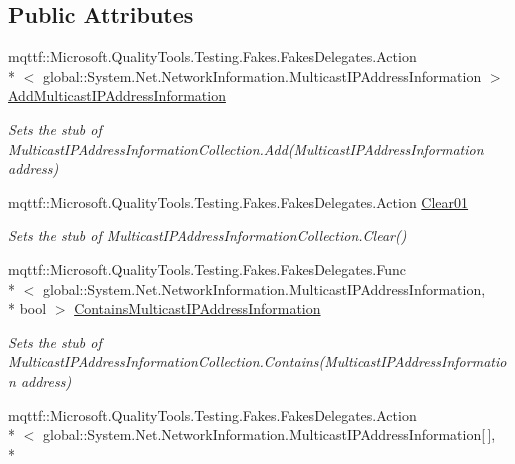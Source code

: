 \subsection*{Public Attributes}
\begin{DoxyCompactItemize}
\item 
mqttf\-::\-Microsoft.\-Quality\-Tools.\-Testing.\-Fakes.\-Fakes\-Delegates.\-Action\\*
$<$ global\-::\-System.\-Net.\-Network\-Information.\-Multicast\-I\-P\-Address\-Information $>$ \hyperlink{class_system_1_1_net_1_1_network_information_1_1_fakes_1_1_stub_multicast_i_p_address_information_collection_a63b557fc15598076c83d2812e9af5eed}{Add\-Multicast\-I\-P\-Address\-Information}
\begin{DoxyCompactList}\small\item\em Sets the stub of Multicast\-I\-P\-Address\-Information\-Collection.\-Add(\-Multicast\-I\-P\-Address\-Information address)\end{DoxyCompactList}\item 
mqttf\-::\-Microsoft.\-Quality\-Tools.\-Testing.\-Fakes.\-Fakes\-Delegates.\-Action \hyperlink{class_system_1_1_net_1_1_network_information_1_1_fakes_1_1_stub_multicast_i_p_address_information_collection_ae9d4bfd16c4dd6411ca37b5b451a81b8}{Clear01}
\begin{DoxyCompactList}\small\item\em Sets the stub of Multicast\-I\-P\-Address\-Information\-Collection.\-Clear()\end{DoxyCompactList}\item 
mqttf\-::\-Microsoft.\-Quality\-Tools.\-Testing.\-Fakes.\-Fakes\-Delegates.\-Func\\*
$<$ global\-::\-System.\-Net.\-Network\-Information.\-Multicast\-I\-P\-Address\-Information, \\*
bool $>$ \hyperlink{class_system_1_1_net_1_1_network_information_1_1_fakes_1_1_stub_multicast_i_p_address_information_collection_af6318fc75b7af87b850af01169d6a15d}{Contains\-Multicast\-I\-P\-Address\-Information}
\begin{DoxyCompactList}\small\item\em Sets the stub of Multicast\-I\-P\-Address\-Information\-Collection.\-Contains(\-Multicast\-I\-P\-Address\-Information address)\end{DoxyCompactList}\item 
mqttf\-::\-Microsoft.\-Quality\-Tools.\-Testing.\-Fakes.\-Fakes\-Delegates.\-Action\\*
$<$ global\-::\-System.\-Net.\-Network\-Information.\-Multicast\-I\-P\-Address\-Information\mbox{[}$\,$\mbox{]}, \\*

\end{DoxyCompactItemize}
